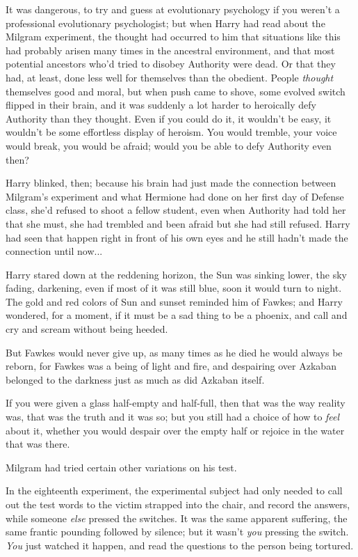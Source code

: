 It was dangerous, to try and guess at evolutionary psychology if you weren’t a professional evolutionary psychologist; but when Harry had read about the Milgram experiment, the thought had occurred to him that situations like this had probably arisen many times in the ancestral environment, and that most potential ancestors who’d tried to disobey Authority were dead. Or that they had, at least, done less well for themselves than the obedient. People \emph{thought} themselves good and moral, but when push came to shove, some evolved switch flipped in their brain, and it was suddenly a lot harder to heroically defy Authority than they thought. Even if you could do it, it wouldn’t be easy, it wouldn’t be some effortless display of heroism. You would tremble, your voice would break, you would be afraid; would you be able to defy Authority even then?

Harry blinked, then; because his brain had just made the connection between Milgram’s experiment and what Hermione had done on her first day of Defense class, she’d refused to shoot a fellow student, even when Authority had told her that she must, she had trembled and been afraid but she had still refused. Harry had seen that happen right in front of his own eyes and he still hadn’t made the connection until now...

Harry stared down at the reddening horizon, the Sun was sinking lower, the sky fading, darkening, even if most of it was still blue, soon it would turn to night. The gold and red colors of Sun and sunset reminded him of Fawkes; and Harry wondered, for a moment, if it must be a sad thing to be a phoenix, and call and cry and scream without being heeded.

But Fawkes would never give up, as many times as he died he would always be reborn, for Fawkes was a being of light and fire, and despairing over Azkaban belonged to the darkness just as much as did Azkaban itself.

If you were given a glass half-empty and half-full, then that was the way reality was, that was the truth and it was so; but you still had a choice of how to \emph{feel} about it, whether you would despair over the empty half or rejoice in the water that was there.

Milgram had tried certain other variations on his test.

In the eighteenth experiment, the experimental subject had only needed to call out the test words to the victim strapped into the chair, and record the answers, while someone \emph{else} pressed the switches. It was the same apparent suffering, the same frantic pounding followed by silence; but it wasn’t \emph{you} pressing the switch. \emph{You} just watched it happen, and read the questions to the person being tortured.

